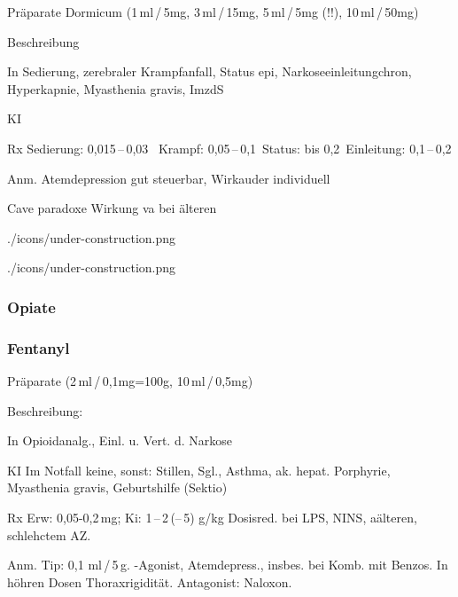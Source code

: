 {
\begin{labeling}[:]{mm}
  \item[Präparate] Dormicum (1\,ml\,/\,5mg, 3\,ml\,/\,15mg, 5\,ml\,/\,5mg (!!), 10\,ml\,/\,50mg)
  \item[Beschreibung] 
  \item[In] Sedierung, zerebraler Krampfanfall,
Status epi, Narkoseeinleitungchron, Hyperkapnie, Myasthenia gravis,
ImzdS
  \item[KI] 
  \item[Rx] Sedierung: 0,015\,--\,0,03 \,\newline
Krampf: 0,05\,--\,0,1\,\newline
Status: bis 0,2\,\newline
Einleitung: 0,1\,--\,0,2\,
\item[Anm.] Atemdepression gut steuerbar, Wirkauder individuell
\item[Cave]  paradoxe Wirkung va bei älteren
\end{labeling}
}
{}
{./icons/under-construction.png}
{}
{}



{

}
{}
{./icons/under-construction.png}
{}
{}

\subsubsection{Opiate}


\subsubsection{Fentanyl}




\begin{labeling}[:]{mm}
  \item[Präparate] (2\,ml\,/\,0,1mg=100{\textmu}g, 10\,ml\,/\,0,5mg)
  \item[Beschreibung:]
  \item[In] Opioidanalg., Einl. u. Vert. d. Narkose
  \item[KI] Im Notfall keine, sonst: Stillen, Sgl., Asthma, ak. hepat.
  Porphyrie, Myasthenia gravis, Geburtshilfe (Sektio)
  \item[Rx] Erw: 0,05-0,2\,mg; Ki: 1\,--\,2\,(--\,5) {\textmu}g/kg \newline
  Dosisred. bei LPS, NINS, aälteren, schlehctem AZ.
  \item[Anm.] Tip: 0,1\,\,ml\,/\,5\,{\textmu}g. {\textmu}-Agonist, Atemdepress.,
  insbes. bei Komb. mit Benzos. In höhren Dosen Thoraxrigidität. Antagonist: Naloxon.
\end{labeling}





